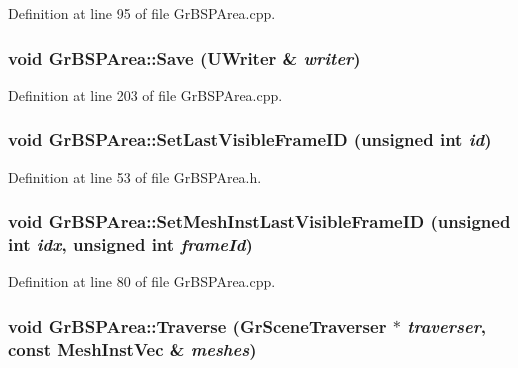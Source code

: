 Definition at line 95 of file GrBSPArea.cpp.\hypertarget{class_gr_b_s_p_area_5d647ed462a407fc32cf9101515e9c40}{
\subsubsection[{Save}]{\setlength{\rightskip}{0pt plus 5cm}void GrBSPArea::Save ({\bf UWriter} \& {\em writer})}}
\label{class_gr_b_s_p_area_5d647ed462a407fc32cf9101515e9c40}




Definition at line 203 of file GrBSPArea.cpp.\hypertarget{class_gr_b_s_p_area_2ff5711022e0a216c6cfee8620e29c40}{
\subsubsection[{SetLastVisibleFrameID}]{\setlength{\rightskip}{0pt plus 5cm}void GrBSPArea::SetLastVisibleFrameID (unsigned int {\em id})}}
\label{class_gr_b_s_p_area_2ff5711022e0a216c6cfee8620e29c40}




Definition at line 53 of file GrBSPArea.h.\hypertarget{class_gr_b_s_p_area_f6ab8deb86e82210eb489399ecdc5c5b}{
\subsubsection[{SetMeshInstLastVisibleFrameID}]{\setlength{\rightskip}{0pt plus 5cm}void GrBSPArea::SetMeshInstLastVisibleFrameID (unsigned int {\em idx}, \/  unsigned int {\em frameId})}}
\label{class_gr_b_s_p_area_f6ab8deb86e82210eb489399ecdc5c5b}




Definition at line 80 of file GrBSPArea.cpp.\hypertarget{class_gr_b_s_p_area_80374c27c8e8b56812437625236d5f9b}{
\subsubsection[{Traverse}]{\setlength{\rightskip}{0pt plus 5cm}void GrBSPArea::Traverse ({\bf GrSceneTraverser} $\ast$ {\em traverser}, \/  const {\bf MeshInstVec} \& {\em meshes})}}
\label{class_gr_b_s_p_area_80374c27c8e8b56812437625236d5f9b}




